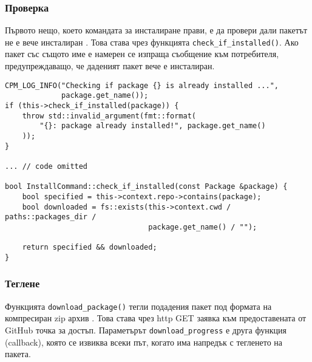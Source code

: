 \subsubsection{Проверка}

Първото нещо, което командата за инсталиране прави, е да провери дали пакетът
не е вече инсталиран . Това става чрез функцията
\texttt{check\_if\_installed()}. Ако пакет със същото име е намерен се изпраща
съобщение към потребителя, предупреждаващо, че даденият пакет вече е инсталиран.

\begin{lstlisting}[style=cpp,
				   caption=Функция за проверка на пакет,
				   label={lst:install-check}]
CPM_LOG_INFO("Checking if package {} is already installed ...",
			 package.get_name());
if (this->check_if_installed(package)) {
	throw std::invalid_argument(fmt::format(
		"{}: package already installed!", package.get_name()
	));
}

... // code omitted

bool InstallCommand::check_if_installed(const Package &package) {
    bool specified = this->context.repo->contains(package);
    bool downloaded = fs::exists(this->context.cwd / paths::packages_dir /
								 package.get_name() / "");

    return specified && downloaded;
}
\end{lstlisting}


\subsubsection{Теглене}

Функцията \texttt{download\_package()} тегли подадения пакет под формата на
компресиран zip архив . Това става чрез
\acrshort{http} GET заявка към предоставената от GitHub точка за достъп.
Параметърът \texttt{download\_progress} е друга функция (callback), която се
извиква всеки път, когато има напредък с тегленето на пакета.


